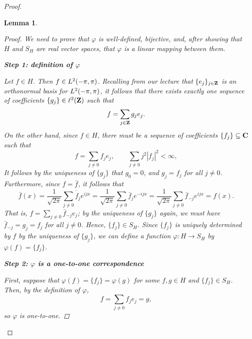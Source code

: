 \documentclass{homework}
\newtheorem{lemma}{Lemma}
\begin{document}
\begin{arabicparts}
\begin{proof}
\begin{lemma}
		\newcommand{\basis}{\mathcal{B}}
		\newcommand{\n}{\frac{1}{\sqrt{2\pi}}}
		\begin{proof}
			We need to prove that $\varphi$ is well-defined, bijective, and, after showing that $H$ and $S_H$ are real vector spaces, that $\varphi$ is a linear mapping between them.
			
			\textbf{Step 1: definition of $\varphi$}
			
			Let $f \in H$. Then $f \in {L^2(-\pi,\pi)}$. Recalling from our lecture that $\{e_j\}_{j\in\textbf{Z}}$ is an orthonormal basis for ${L^2(-\pi,\pi)}$, it follows that there exists exactly one sequence of coefficients $\{g_j\}\in\ell^2(\textbf{Z})$ such that
			\begin{equation}
				f = \sum_{j\in\textbf{Z}}g_je_j.
			\end{equation}
			On the other hand, since $f\in H$, there must be a sequence of coefficients $\{f_j\} \subseteq\textnormal{\bf C}$ such that
			\begin{equation}
				f = \sum_{j\ne 0}f_je_j,\qquad \sum_{j\ne0}j^2|f_j|^2 < \infty,
			\end{equation}
			It follows by the uniqueness of $\{g_j\}$ that $g_0 = 0$, and $g_j = f_j$ for all $j \ne 0$. Furthermore, since $f = \bar{f}$, it follows that
			\begin{equation}
				\bar{f}(x) = \n\overline{\sum_{j\ne 0}f_je^{ijx}} = \n\sum_{j\ne 0}\bar{f}_je^{-ijx}=\n\sum_{j\ne0}\bar{f}_{-j}e^{ijx} = f(x).
			\end{equation}
			That is, $f = \sum\limits_{j\ne 0}\bar{f}_{-j}e_j$; by the uniqueness of $\{g_j\}$ again, we must have $\bar{f}_{-j} = g_j = f_j$ for all $j \ne 0$. Hence, $\{f_j\} \in S_H$. Since $\{f_j\}$ is uniquely determined by $f$ by the uniqueness of $\{g_j\}$, we can define a function $\varphi : H \to S_H$ by $\varphi(f) = \{f_j\}$.
			
			\textbf{Step 2: $\varphi$ is a one-to-one correspondence}
			
			First, suppose that $\varphi(f) = \{f_j\} = \varphi(g)$ for some $f,g \in H$ and $\{f_j\} \in S_H$. Then, by the definition of $\varphi$,
			\begin{equation}
				f = \sum_{j\ne 0}f_je_j = g,
			\end{equation}
			so $\varphi$ is one-to-one.
			

\end{proof}
\end{lemma}
\end{proof}
\end{arabicparts}
\end{document}
